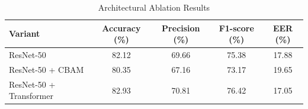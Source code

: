 \begin{table}[htbp]
\caption{Architectural Ablation Results}
\label{tab:arch_ablation}
\begin{center}
\begin{tabular}{|l|c|c|c|c|}
\hline
\textbf{Variant} & \textbf{Accuracy (\%)} & \textbf{Precision (\%)} & \textbf{F1-score (\%)} & \textbf{EER (\%)} \\
\hline
ResNet-50 & 82.12 & 69.66 & 75.38 & 17.88 \\
ResNet-50 + CBAM & 80.35 & 67.16 & 73.17 & 19.65 \\
ResNet-50 + Transformer & 82.93 & 70.81 & 76.42 & 17.05 \\
\hline
\end{tabular}
\end{center}
\end{table}